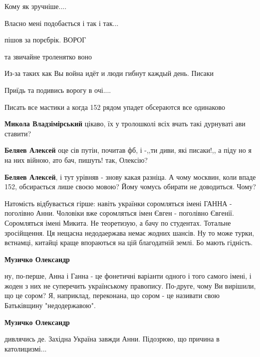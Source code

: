 \begin{itemize}
Кому як зручніше....

Власно мені подобається і так і так...

\begin{itemize} %
пішов за порєбрік. ВОРОГ

та звичайне троленятко воно

Из-за таких как Вы война идёт и люди гибнут каждый день. Писаки

Приїдь та подивись ворогу в очі....

Писать все мастики а когда 152 рядом упадет обсераются все одинаково

\textbf{Микола Владзімірський} цікаво, їх у тролошколі всіх вчать такі дурнуваті ави ставити?

\textbf{Беляев Алексей} оце сів путін, почитав фб, і -,,ти диви, які писаки!,, а піду но я на них війною, ато бач, пишуть! так, Олексію?

\textbf{Беляев Алексей}, і тут урівняв - знову какая разніца. А чому москвин, коли впаде 152, обсирається лише своєю мовою? Йому чомусь обирати не доводиться. Чому?
\end{itemize} %


Натомість відбувається гірше: навіть українки соромляться імені ГАННА -
поголівно Анни. Чоловіки вже соромляться імен Євген - поголівно Євгенії.
Соромляться імені Микита. Не теоретизую, а бачу по студентах. Тотальне
зросійщення. Ця нещасна недодаержава немає жодних шансів. Ну то може турки,
вєтнамці, китайці краще впораються на цій благодатній землі. Бо мають гідність.

\begin{itemize} %
\textbf{Музичко Олександр} 

ну, по-перше, Анна і Ганна - це фонетичні варіанти одного і того самого імені,
і жоден з них не суперечить українському правопису. По-друге, чому Ви вирішили,
що це сором? Я, наприклад, переконана, що сором - це називати свою Батьківщину
"недодержавою".

\textbf{Музичко Олександр} 

дивлячись де. Західна Україна завжди Анни. Підозрюю, що причина в
католицизмі...

\end{itemize} %

\end{itemize} %
